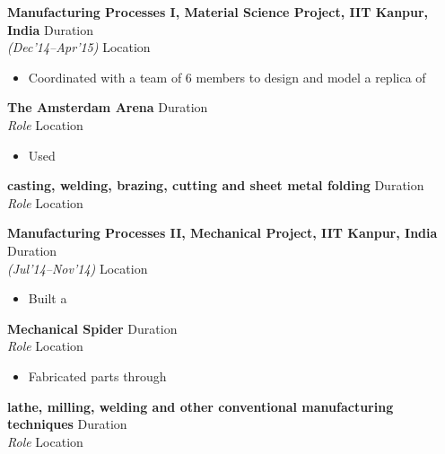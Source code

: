 \documentclass[11pt,a4paper]{article}
\begin{document}
\noindent \textbf{Manufacturing Processes I, Material Science Project, IIT Kanpur, India} \hfill Duration \\
\textit{(Dec'14--Apr'15)} \hfill Location
\begin{itemize}
  \item Coordinated with a team of 6 members to design and model a replica of
\end{itemize}


\noindent \textbf{The Amsterdam Arena} \hfill Duration \\
\textit{Role} \hfill Location
\begin{itemize}
  \item Used
\end{itemize}


\noindent \textbf{casting, welding, brazing, cutting and sheet metal folding} \hfill Duration \\
\textit{Role} \hfill Location



\noindent \textbf{Manufacturing Processes II, Mechanical Project, IIT Kanpur, India} \hfill Duration \\
\textit{(Jul'14--Nov'14)} \hfill Location
\begin{itemize}
  \item Built a
\end{itemize}


\noindent \textbf{Mechanical Spider} \hfill Duration \\
\textit{Role} \hfill Location
\begin{itemize}
  \item Fabricated parts through
\end{itemize}


\noindent \textbf{lathe, milling, welding and other conventional manufacturing techniques} \hfill Duration \\
\textit{Role} \hfill Location
\end{document}
